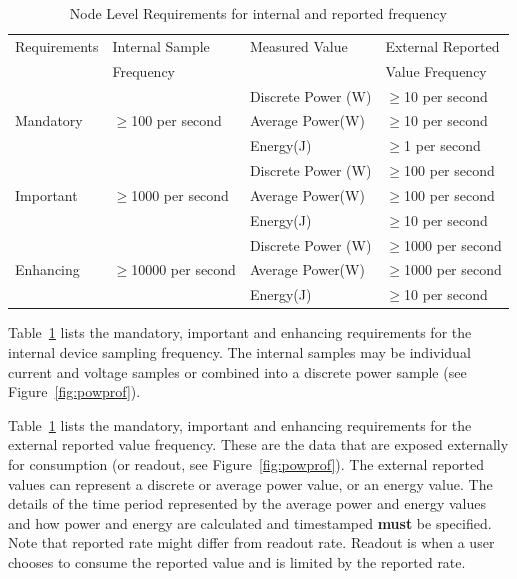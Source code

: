 \begin{table}[htbp]
\caption{Node Level Requirements for internal and reported frequency}
\label{tab:nodelevel}
\centering
\begin{tabular}{ |l|l|l|l| }
\hline
Requirements & Internal Sample & Measured Value & External Reported \\
 & Frequency & & Value Frequency \\
\hline

\multirow{3}{*}{Mandatory} & \multirow{3}{*}{\mbox{$ \ge $}100 per second} &
Discrete Power (W) & \mbox{$ \ge $}10 per second \\  
 & & Average Power(W) & \mbox{$ \ge $}10 per second \\  
 & & Energy(J) & \mbox{$ \ge $}1 per second \\  \hline

\multirow{3}{*}{Important} & \multirow{3}{*}{\mbox{$ \ge $}1000 per second} &   
Discrete Power (W) & \mbox{$ \ge $}100 per second \\  
 & & Average Power(W) & \mbox{$ \ge $}100 per second \\  
 & & Energy(J) & \mbox{$ \ge $}10 per second \\  \hline

\multirow{3}{*}{Enhancing} & \multirow{3}{*}{\mbox{$ \ge $}10000 per second} & 
Discrete Power (W) & \mbox{$ \ge $}1000 per second \\  
 & & Average Power(W) & \mbox{$ \ge $}1000 per second \\  
 & & Energy(J) & \mbox{$ \ge $}10 per second \\  \hline

\end{tabular}
\end{table}

Table~\ref{tab:nodelevel} lists the mandatory, important and enhancing requirements for the 
internal device sampling frequency. The internal samples may be individual current and 
voltage samples or combined into a discrete power sample (see Figure~\ref{fig:powprof}).

Table~\ref{tab:nodelevel} lists the mandatory, important and enhancing requirements for the 
external reported value frequency. These are the data that are exposed externally for 
consumption (or readout, see Figure~\ref{fig:powprof}). The external reported values can represent a 
discrete or average power value, or an energy value. The details of the time period represented 
by the average power and energy values and how power and energy are calculated and timestamped \textbf{must}
be specified. Note that reported rate might differ from readout rate. Readout is when a user 
chooses to consume the reported value and is limited by the reported rate.

